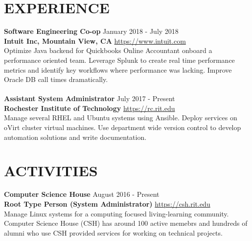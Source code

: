 \documentclass[line, margin, 11pt]{res}
\begin{document}
\begin{resume}
\section{EXPERIENCE}
{\bf \large{Software Engineering Co-op}} \hfill January 2018 - July 2018 \\
{\bf Intuit Inc, Mountain View, CA} \hfill \url{https://www.intuit.com} \\
Optimize Java backend for Quickbooks Online Accountant onboard a performance oriented team.  Leverage Splunk to create real
time performance metrics and identify key workflows where performance was lacking.  Improve Oracle DB call times dramatically.
\\
\\
{\bf \large{Assistant System Administrator}} \hfill July 2017 - Present \\
{\bf Rochester Institute of Technology} \hfill \url{https://rc.rit.edu} \\
Manage several RHEL and Ubuntu systems using Ansible.  Deploy services on oVirt cluster virtual machines.  Use department wide version control to
develop automation solutions and write documentation.

\section{ACTIVITIES}
{\bf \large{Computer Science House}} \hfill August 2016 - Present \\
{\bf Root Type Person (System Administrator)} \hfill \url{https://csh.rit.edu} \\
Manage Linux systems for a computing focused living-learning community.
Computer Science House (CSH) has around 100 active memebrs and hundreds of alumni
who use CSH provided services for working on technical projects.

\end{resume}
\end{document}
